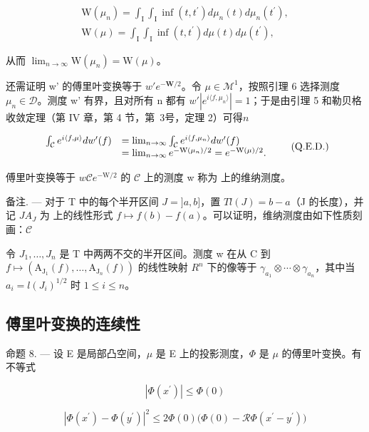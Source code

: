 \[
\begin{array}{r} \mathrm{W} (\mu_ {n}) = \int_ {\mathrm{I}} \int_ {\mathrm{I}} \inf (t, t ^ {\prime}) d \mu_ {n} (t) d \mu_ {n} (t ^ {\prime}), \\ \mathrm{W} (\mu) = \int_ {\mathrm{I}} \int_ {\mathrm{I}} \inf (t, t ^ {\prime}) d \mu (t) d \mu (t ^ {\prime}), \end{array}
\]

从而 \(\lim_{n\to \infty}\mathrm{W}(\mu_n) = \mathrm{W}(\mu)\)。

还需证明 w' 的傅里叶变换等于 \(w'\)\(e^{-\mathbf{W}/2}\)。令 \(\mu \in \mathcal{M}^1\)，按照引理 6 选择测度 \(\mu_n \in \mathcal{D}\)。测度 w' 有界，且对所有 n 都有 \(w'\)\(|e^{i\langle f,\mu_n\rangle}| = 1\)；于是由引理 5 和勒贝格收敛定理（第 IV 章，第 4 节，第~3号，定理 2）可得\(n\)

\[
\begin{array}{r l} \int_ {\mathcal {C}} e ^ {i \langle f, \mu \rangle} d w ^ {\prime} (f) & = \lim _ {n \to \infty} \int_ {\mathcal {C}} e ^ {i \langle f, \mu_ {n} \rangle} d w ^ {\prime} (f) \\ & = \lim _ {n \to \infty} e ^ {- \mathrm{W} (\mu_ {n}) / 2} = e ^ {- \mathrm{W} (\mu) / 2}. \end{array}\tag{Q.E.D.}
\]

傅里叶变换等于 \(w\)\(\mathcal{C}\)\(e^{-\mathrm{W} / 2}\) 的 \(\mathcal{C}\) 上的测度 w 称为  上的维纳测度。

备注. --- 对于 T 中的每个半开区间 \(J = ]a, b]\)，置 \(T\)\(l(J) = b - a\)（J 的长度），并记 \(J\)\(A_J\) 为  上的线性形式 \(f \mapsto f(b) - f(a)\)。可以证明，维纳测度由如下性质刻画：\(\mathcal{C}\)

令 \(J_{1},\ldots,J_{n}\) 是 T 中两两不交的半开区间。测度 w 在从 C 到 \(f\mapsto\left(\mathrm{A}_{\mathrm{J}_{1}}(f),\ldots,\mathrm{A}_{\mathrm{J}_{n}}(f)\right)\) 的线性映射 \(R^{n}\) 下的像等于 \(\gamma_{a_{1}}\otimes\cdots\otimes\gamma_{a_{n}}\)，其中当 \(a_{i}=l(J_{i})^{1/2}\) 时 \(1\leqslant i\leqslant n\)。

\subsection{傅里叶变换的连续性}

命题 8. --- 设 E 是局部凸空间，\(\mu\) 是 E 上的投影测度，\(\Phi\) 是 \(\mu\) 的傅里叶变换。有不等式

\[
\left| \Phi (x ^ {\prime}) \right| \leqslant \Phi (0)\tag{53}
\]

\[
\left| \Phi (x ^ {\prime}) - \Phi (y ^ {\prime}) \right| ^ {2} \leqslant 2 \Phi (0) \big (\Phi (0) - \mathcal {R} \Phi (x ^ {\prime} - y ^ {\prime}) \big)\tag{54}
\]

